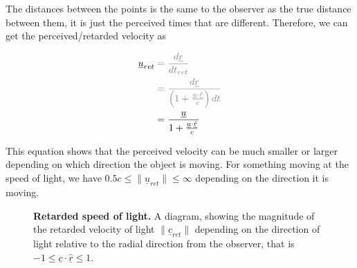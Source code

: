 The distances between the points is the same to the observer as the true distance between them, it is just the perceived times that are different.
Therefore, we can get the perceived/retarded velocity as

\begin{equation}
	\begin{aligned}
		\underline{u}_{ret} & \color{gray}= \frac{d\underline{r}}{dt_{ret}}                                                                     \\
		                    & \color{gray}= \frac{d\underline{r}}{ \left( 1 + \frac{ \underline{u} \cdot \underline{\hat{r}} }{ c} \right) dt } \\
		                    & = \frac{\underline{u}}{ 1 + \frac{ \underline{u} \cdot \underline{\hat{r}} }{ c} }
	\end{aligned}
\end{equation}

This equation shows that the perceived velocity can be much smaller or larger depending on which direction the object is moving.
For something moving at the speed of light, we have $ 0.5 c \leq \|\underline{u}_{ret}\| \leq \infty $ depending on the direction it is moving.

\begin{figure}[H]
	\centering
	\caption{\textbf{Retarded speed of light.} A diagram, showing the magnitude of the retarded velocity of light $\|\underline{c}_{ret}\|$ depending on the direction of light relative to the radial direction from the observer, that is $-1 \leq \underline{c}\cdot\underline{\hat{r}} \leq 1$.}
	\label{fig: retarded speed of light}
\end{figure}

